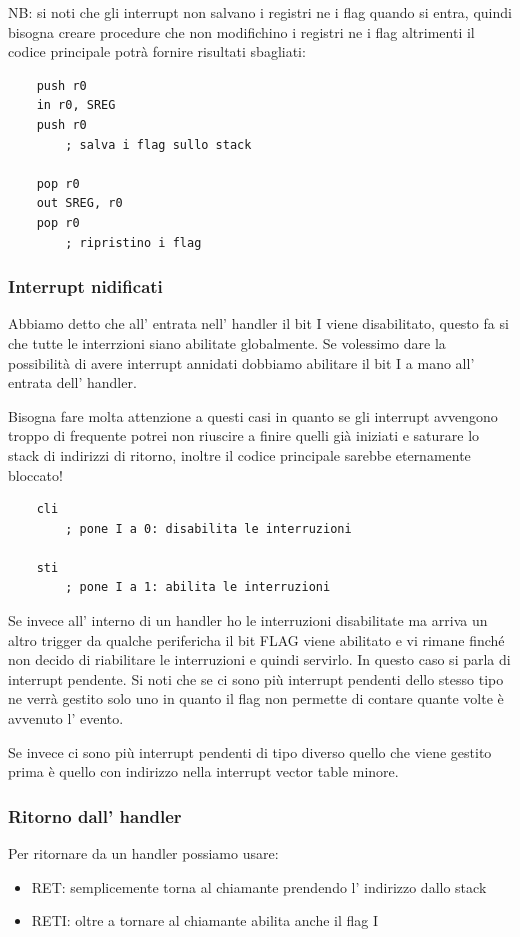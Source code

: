 NB: si noti che gli interrupt non salvano i registri ne i flag quando si entra, quindi bisogna creare procedure che non modifichino i registri ne i flag altrimenti il codice principale potrà fornire risultati sbagliati:
\begin{verbatim}
    push r0
    in r0, SREG
    push r0
        ; salva i flag sullo stack
    
    pop r0
    out SREG, r0
    pop r0
        ; ripristino i flag
\end{verbatim}

\subsubsection{Interrupt nidificati}
Abbiamo detto che all' entrata nell' handler il bit I viene disabilitato, questo fa si che tutte le interrzioni siano abilitate globalmente.
Se volessimo dare la possibilità di avere interrupt annidati dobbiamo abilitare il bit I a mano all' entrata dell' handler.

Bisogna fare molta attenzione a questi casi in quanto se gli interrupt avvengono troppo di frequente potrei non riuscire a finire quelli già iniziati e saturare lo stack di indirizzi di ritorno, inoltre il codice principale sarebbe eternamente bloccato!
\begin{verbatim}
    cli
        ; pone I a 0: disabilita le interruzioni
        
    sti
        ; pone I a 1: abilita le interruzioni
\end{verbatim}

Se invece all' interno di un handler ho le interruzioni disabilitate ma arriva un altro trigger da qualche perifericha il bit FLAG viene abilitato e vi rimane finché non decido di riabilitare le interruzioni e quindi servirlo.
In questo caso si parla di interrupt pendente.
Si noti che se ci sono più interrupt pendenti dello stesso tipo ne verrà gestito solo uno in quanto il flag non permette di contare quante volte è avvenuto l' evento.

Se invece ci sono più interrupt pendenti di tipo diverso quello che viene gestito prima è quello con indirizzo nella interrupt vector table minore.

\subsubsection{Ritorno dall' handler}
Per ritornare da un handler possiamo usare:
\begin{itemize}
    \item RET: semplicemente torna al chiamante prendendo l' indirizzo dallo stack
    \item RETI: oltre a tornare al chiamante abilita anche il flag I
\end{itemize}

